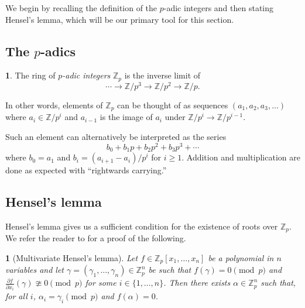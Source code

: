 \documentclass[10pt,a4paper]{amsart}
\numberwithin{equation}{section}
\numberwithin{figure}{section}
\theoremstyle{definition}
\theoremstyle{remark}
\theoremstyle{plain}
\newtheorem{thm}{\protect\theoremname}[section]
\theoremstyle{plain}
\theoremstyle{definition}
\newtheorem{defn}{\protect\definitionname}[section]
\theoremstyle{plain}
\theoremstyle{plain}
\providecommand{\definitionname}{Definition}
\providecommand{\theoremname}{Theorem}
\newcommand{\Z}{\mathbb{Z}}
\newcommand{\Q}{\mathbb{Q}}
\begin{document}
	We begin by recalling the definition of the $p$-adic integers and then stating Hensel's lemma, which will be our primary tool for this section.
	\subsection{The $p$-adics}
	\begin{defn}
		The ring of \emph{$p$-adic integers} $\Z_p$ is the inverse limit of
		\[
		\cdots \to \Z/p^3 \to \Z/p^2 \to \Z/p.
		\]
	\end{defn}
	In other words, elements of $\Z_p$ can be thought of as sequences $(a_1,a_2,a_3,\ldots)$ where $a_i \in \Z/p^i$ and $a_{i-1}$ is the image of $a_i$ under $\Z/p^i \to \Z/p^{i-1}$.
	
	Such an element can alternatively be interpreted as the series
	\[
	b_0 + b_1 p + b_2 p^2 + b_3 p^3 + \cdots
	\]
	where $b_0 = a_1$ and $b_i = (a_{i+1} - a_i)/p^i$ for $i \geq 1$. Addition and multiplication are done as expected with ``rightwards carrying.''
	
	\subsection{Hensel's lemma}
	Hensel's lemma gives us a sufficient condition for the existence of roots over $\Z_p$. We refer the reader to \cite{henselMO} for a proof of the following.
	\begin{thm}[Multivariate Hensel's lemma]\label{thm:hensels-one-eq}
		Let $f \in \Z_p[x_1,\ldots,x_n]$ be a polynomial in $n$ variables and let $\gamma = (\gamma_1,\ldots,\gamma_n)\in \Z_p^n$ be such that $f(\gamma) = 0 \pmod p$ and $\frac{\partial f}{\partial x_i}(\gamma) \ncong 0 \pmod p$ for some $i\in \{1,\ldots,n\}$. Then there exists $\alpha \in \Z_p^n$ such that, for all $i$, $\alpha_i = \gamma_i \pmod p$ and $f(\alpha) = 0$.
	\end{thm}
\end{document}

